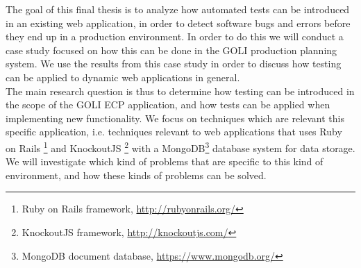 
The goal of this final thesis is to analyze how automated tests can be
introduced in an existing web application, in order to detect software
bugs and errors before they end up in a production environment. In order
to do this we will conduct a case study focused on how this can be done
in the GOLI production planning system. We use the results from this
case study in order to discuss how testing can be applied to dynamic
web applications in general.\\

The main research question is thus to determine how testing can be
introduced in the scope of the GOLI ECP application, and how tests
can be applied when implementing new functionality. We focus on
techniques which are relevant this specific application, i.e.
techniques relevant to web applications that uses Ruby on Rails
\footnote{Ruby on Rails framework, \url{http://rubyonrails.org/}}
and KnockoutJS
\footnote{KnockoutJS framework, \url{http://knockoutjs.com/}} with a
MongoDB\footnote{MongoDB document database, \url{https://www.mongodb.org/}}
database system for data storage. We will investigate which kind of
problems that are specific to this kind of environment, and how these
kinds of problems can be solved.\\
